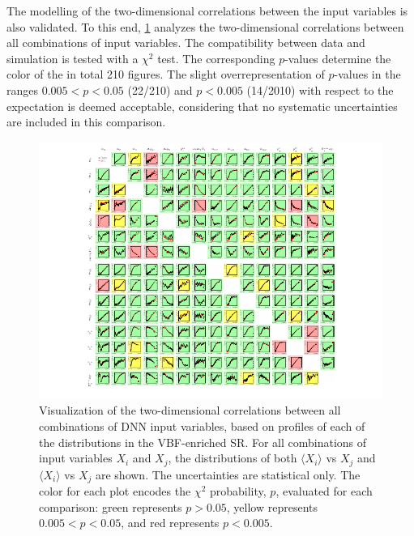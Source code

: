 The modelling of the two-dimensional correlations between the input variables is also validated.
To this end, \cref{fig:dnn-features-profiles} analyzes the two-dimensional correlations between all combinations of input variables. The compatibility between data and simulation is tested with a $\chi^2$ test.
The corresponding $p$-values determine the color of the in total 210 figures.
The slight overrepresentation of $p$-values in the ranges $0.005 < p < 0.05$ (22/210) and $p < 0.005$ (14/2010) with respect to the expectation is deemed acceptable, considering that no systematic uncertainties are included in this comparison.
\begin{figure}[ht]
    \includegraphics[width=\textwidth,trim=45 0 45 0]{figures/hww/dnn/correlations_PROF_SR.pdf}
    \caption[Visualization of the two-dimensional correlations between all combinations of DNN input variables.]{Visualization of the two-dimensional correlations between all combinations of DNN input variables, based on profiles of each of the distributions in the VBF-enriched \TwoJet SR. For all combinations of input variables $X_i$ and $X_j$, the distributions of both $\langle X_i \rangle$ vs $X_j$ and $\langle X_i \rangle$ vs $X_j$ are shown. The uncertainties are statistical only. The color for each plot encodes the $\chi^2$ probability, $p$, evaluated for each comparison: green represents $p > 0.05$, yellow represents $0.005 < p < 0.05$, and red represents $p < 0.005$.}
    \label{fig:dnn-features-profiles}
\end{figure}

